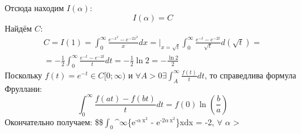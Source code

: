 \documentclass[11pt]{article}
\begin{document}
Отсюда находим \(I(\alpha)\):
$$I(\alpha) = C$$
Найдём \(C\):
\begin{multline*}
C = I(1) = \int_0^\infty\frac{e^{-x^2} - e^{-2x^2}}xdx =\bigg|_{x = \sqrt t}\int_0^\infty\frac{e^{-t} - e^{-2t}}{\sqrt t}d(\sqrt t) = \\
= -\frac12\int_0^\infty\frac{e^{-t} - e^{-2t}}tdt = -\frac12\ln2 = -\frac{\ln2}2
\end{multline*}
Поскольку \(f(t) = e^{-t} \in C[0; \infty)\) и \(\forall A > 0 \exists \int_A^\infty\frac{f(t)}tdt\), то справедлива формула Фруллани:
$$\int_0^\infty\frac{f(at) - f(bt)}tdt = f(0)\ln\left(\frac ba\right)$$
Окончательно получаем:
\$\$\(\int_{\text{0}}\)\^{}\(\infty\)\frac\{e\(^{\text{-}\alpha\ \text{x}^{\text{2}}}\) - e\(^{\text{-2}\alpha\ \text{x}^{\text{2}}}\)\}xdx = -2, \(\forall\) \(\alpha\) > 
\end{document}
